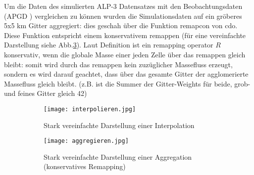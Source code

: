Um die Daten des simulierten ALP-3 Datensatzes mit den Beobachtungsdaten (APGD \cite{meteoswiss}) vergleichen zu können wurden die Simulationsdaten auf ein gröberes 5x5 km Gitter aggregiert: dies geschah über die Funktion remapcon von cdo. Diese Funktion entspricht einem konservativem remappen (für eine vereinfachte Darstellung siehe Abb.\ref{fig:aggregieren}). Laut Definition \cite{remapcon} ist ein remapping operator $R$ konservativ, wenn die globale Masse einer jeden Zelle über das remappen gleich bleibt: somit wird durch das remappen kein zuzüglicher Massefluss erzeugt, sondern es wird darauf geachtet, dass über das gesamte Gitter der agglomerierte Massefluss gleich bleibt. (z.B. ist die Summer der Gitter-Weights für beide, grob- und feines Gitter gleich 42)
\begin{figure}[h]
	\begin{subfigure}{0.49\textwidth}
		\texttt{[image: interpolieren.jpg]}
		\caption{Stark vereinfachte Darstellung einer Interpolation}
		\label{fig:interpolieren}
	\end{subfigure}
	\begin{subfigure}{0.49\textwidth}
		\texttt{[image: aggregieren.jpg]}
		\caption{Stark vereinfachte Darstellung einer Aggregation (konservatives Remapping)}
		\label{fig:aggregieren}
	\end{subfigure}
	\caption{}
\end{figure}